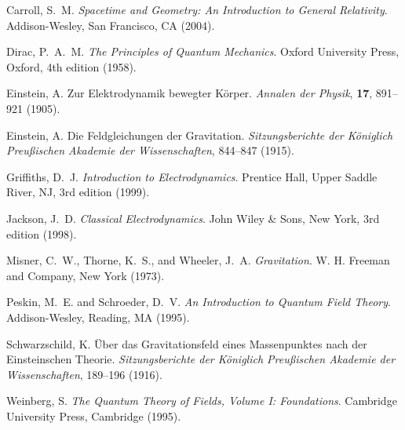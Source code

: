 \documentclass[12pt,a4paper]{article}
\begin{document}
	
	\begin{thebibliography}{99}
		
		Carroll, S.~M.
		\newblock \textit{Spacetime and Geometry: An Introduction to General Relativity}.
		\newblock Addison-Wesley, San Francisco, CA (2004).
		
		Dirac, P.~A.~M.
		\newblock \textit{The Principles of Quantum Mechanics}.
		\newblock Oxford University Press, Oxford, 4th edition (1958).
		
		Einstein, A.
		\newblock Zur Elektrodynamik bewegter Körper.
		\newblock \textit{Annalen der Physik}, \textbf{17}, 891--921 (1905).
		
		Einstein, A.
		\newblock Die Feldgleichungen der Gravitation.
		\newblock \textit{Sitzungsberichte der Königlich Preußischen Akademie der Wissenschaften}, 844--847 (1915).
		
		Griffiths, D.~J.
		\newblock \textit{Introduction to Electrodynamics}.
		\newblock Prentice Hall, Upper Saddle River, NJ, 3rd edition (1999).
		
		Jackson, J.~D.
		\newblock \textit{Classical Electrodynamics}.
		\newblock John Wiley \& Sons, New York, 3rd edition (1998).
		
		Misner, C.~W., Thorne, K.~S., and Wheeler, J.~A.
		\newblock \textit{Gravitation}.
		\newblock W. H. Freeman and Company, New York (1973).
		
		Peskin, M.~E. and Schroeder, D.~V.
		\newblock \textit{An Introduction to Quantum Field Theory}.
		\newblock Addison-Wesley, Reading, MA (1995).
		
		Schwarzschild, K.
		\newblock Über das Gravitationsfeld eines Massenpunktes nach der Einsteinschen Theorie.
		\newblock \textit{Sitzungsberichte der Königlich Preußischen Akademie der Wissenschaften}, 189--196 (1916).
		
		Weinberg, S.
		\newblock \textit{The Quantum Theory of Fields, Volume I: Foundations}.
		\newblock Cambridge University Press, Cambridge (1995).
		
	\end{thebibliography}
	
	
\end{document}

